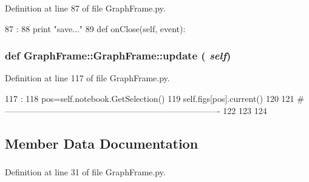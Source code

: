 Definition at line 87 of file GraphFrame.py.


\begin{DoxyCode}
87                            :
88         print "save..."
89 
    def onClose(self, event):
\end{DoxyCode}
\hypertarget{classGraphFrame_1_1GraphFrame_ae950d08eb38967d3c204f9107cbf10f9}{
\subsubsection[{update}]{\setlength{\rightskip}{0pt plus 5cm}def GraphFrame::GraphFrame::update ( {\em self})}}
\label{classGraphFrame_1_1GraphFrame_ae950d08eb38967d3c204f9107cbf10f9}


Definition at line 117 of file GraphFrame.py.


\begin{DoxyCode}
117                     :
118         pos=self.notebook.GetSelection()
119         self.figs[pos].current()
120 
121 #----------------------------------------------------------------------------
122 
123 
124 

\end{DoxyCode}


\subsection{Member Data Documentation}
\hypertarget{classGraphFrame_1_1GraphFrame_ada0f65a1687cb280f0c806880018bab6}{
\subsubsection[{app}]{}}
\label{classGraphFrame_1_1GraphFrame_ada0f65a1687cb280f0c806880018bab6}


Definition at line 31 of file GraphFrame.py.\hypertarget{classGraphFrame_1_1GraphFrame_a11acbdec2055acdd75e28b9d5e7f5d68}{
\subsubsection[{figId}]{}}
\label{classGraphFrame_1_1GraphFrame_a11acbdec2055acdd75e28b9d5e7f5d68}


